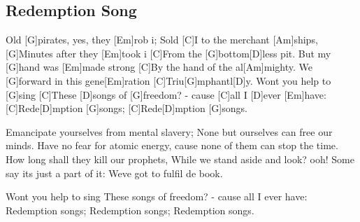 \subsection*{Redemption Song   }



\begin{guitar}


Old [G]pirates, yes, they [Em]rob i;
Sold [C]I to the merchant [Am]ships,
[G]Minutes after they [Em]took i
[C]From the [G]bottom[D]less pit.
But my [G]hand was [Em]made strong
[C]By the hand of the al[Am]mighty.
We [G]forward in this gene[Em]ration
[C]Triu[G]mphantl[D]y.
Wont you help to [G]sing
[C]These [D]songs of [G]freedom? -
cause [C]all I [D]ever [Em]have:
[C]Rede[D]mption [G]songs;
[C]Rede[D]mption [G]songs.


Emancipate yourselves from mental slavery;
None but ourselves can free our minds.
Have no fear for atomic energy,
cause none of them can stop the time.
How long shall they kill our prophets,
While we stand aside and look? ooh!
Some say its just a part of it:
Weve got to fulfil de book.

Wont you help to sing
These songs of freedom? -
cause all I ever have:
Redemption songs;
Redemption songs;
Redemption songs.
\end{guitar}
